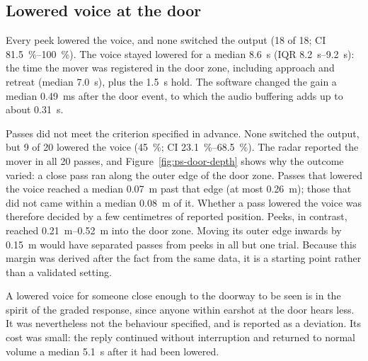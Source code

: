 \subsection{Lowered voice at the door}
\label{sec:ps-door}

Every peek lowered the voice, and none switched the output (18 of 18;
CI \SIrange{81.5}{100}{\percent}). The voice stayed lowered for a median
\SI{8.6}{\second} (IQR \SIrange{8.2}{9.2}{\second}): the time the mover was
registered in the door zone, including approach and retreat (median
\SI{7.0}{\second}), plus the \SI{1.5}{\second} hold. The software changed the
gain a median \SI{0.49}{\milli\second} after the door event, to which the
audio buffering adds up to about \SI{0.31}{\second}.

Passes did not meet the criterion specified in advance. None switched the
output, but 9 of 20 lowered the voice (\SI{45}{\percent}; CI
\SIrange{23.1}{68.5}{\percent}). The radar reported the mover in all 20 passes,
and Figure~\ref{fig:ps-door-depth} shows why the outcome varied: a close pass
ran along the outer edge of the door zone. Passes that lowered the voice
reached a median \SI{0.07}{\metre} past that edge (at most
\SI{0.26}{\metre}); those that did not came within a median \SI{0.08}{\metre}
of it. Whether a pass lowered the voice was therefore decided by a few
centimetres of reported position. Peeks, in contrast, reached
\SIrange{0.21}{0.52}{\metre} into the door zone. Moving its outer edge inwards
by \SI{0.15}{\metre} would have separated passes from peeks in all but one
trial. Because this margin was derived after the fact from the same data, it
is a starting point rather than a validated setting.

A lowered voice for someone close enough to the doorway to be seen is in the
spirit of the graded response, since anyone within earshot at the door hears
less. It was nevertheless not the behaviour specified, and is reported as a
deviation. Its cost was small: the reply continued without interruption and
returned to normal volume a median \SI{5.1}{\second} after it had been lowered.

